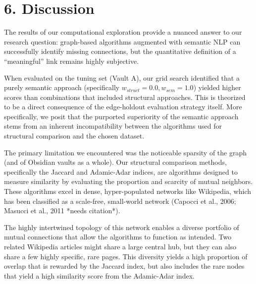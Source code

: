 \documentclass[fontsize=11pt]{article}
\begin{document}
\section*{6. Discussion}

The results of our computational exploration provide a nuanced answer to our research question: graph-based algorithms augmented with semantic NLP can successfully identify missing connections, but the quantitative definition of a \enquote{meaningful} link remains highly subjective.

When evaluated on the tuning set (Vault A), our grid search identified that a purely semantic approach (specifically $w_{struct}=0.0, w_{sem}=1.0$) yielded higher scores than combinations that included structural approaches. This is theorized to be a direct consequence of the edge-holdout evaluation strategy itself. More specifically, we posit that the purported superiority of the semantic approach stems from an inherent incompatibility between the algorithms used for structural comparison and the chosen dataset. 

The primary limitation we encountered was the noticeable sparsity of the graph (and of Obsidian vaults as a whole). Our structural comparison methods, specifically the Jaccard and Adamic-Adar indices, are algorithms designed to measure similarity by evaluating the proportion and scarcity of mutual neighbors. These algorithms excel in dense, hyper-populated networks like Wikipedia, which has been classified as a scale-free, small-world network (Capocci et al., 2006; Masucci et al., 2011 *needs citation*). 

The highly intertwined topology of this network enables a diverse portfolio of mutual connections that allow the algorithms to function as intended. Two related Wikipedia articles might share a large central hub, but they can also share a few highly specific, rare pages. This diversity yields a high proportion of overlap that is rewarded by the Jaccard index, but also includes the rare nodes that yield a high similarity score from the Adamic-Adar index.
\end{document}
